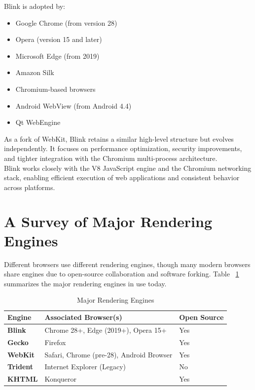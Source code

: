 \documentclass{scrbook}
\begin{document}
Blink is adopted by:
\begin{itemize}
    \item Google Chrome (from version 28)
    \item Opera (version 15 and later)
    \item Microsoft Edge (from 2019)
    \item Amazon Silk
    \item Chromium-based browsers
    \item Android WebView (from Android 4.4)
    \item Qt WebEngine
\end{itemize}

As a fork of WebKit, Blink retains a similar high-level structure but evolves
independently. It focuses on performance optimization, security improvements,
and tighter integration with the Chromium multi-process architecture. \\

Blink works closely with the V8 JavaScript engine and the Chromium networking
stack, enabling efficient execution of web applications and consistent behavior
across platforms.

\section{A Survey of Major Rendering Engines}

Different browsers use different rendering engines, though many modern browsers share engines due to open-source collaboration and software forking. Table ~\ref{tbl:major_rendering_engines} summarizes the major rendering engines in use today. \\

\begin{table}[h]
    \centering
    \begin{tabular}{|l|l|l|}
    \hline
    \textbf{Engine} & \textbf{Associated Browser(s)} & \textbf{Open Source} \\
    \hline
    \textbf{Blink} & Chrome 28+, Edge (2019+), Opera 15+ & Yes \\
    \hline
    \textbf{Gecko} & Firefox & Yes \\
    \hline
    \textbf{WebKit} & Safari, Chrome (pre-28), Android Browser & Yes \\
    \hline
    \textbf{Trident} & Internet Explorer (Legacy) & No \\
    \hline
    \textbf{KHTML} & Konqueror & Yes \\
    \hline
    \end{tabular}
    \caption{Major Rendering Engines}
    \label{tbl:major_rendering_engines}
\end{table}
\end{document}
